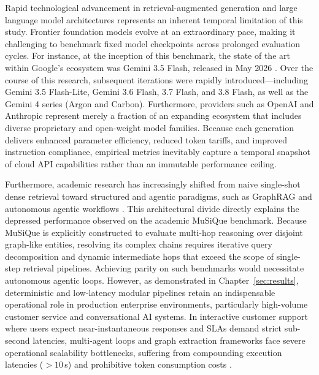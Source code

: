 Rapid technological advancement in retrieval-augmented generation and large language model architectures represents an inherent temporal limitation of this study. Frontier foundation models evolve at an extraordinary pace, making it challenging to benchmark fixed model checkpoints across prolonged evaluation cycles. For instance, at the inception of this benchmark, the state of the art within Google's ecosystem was Gemini 3.5 Flash, released in May 2026 \citep{GoogleCloudModelVersions}. Over the course of this research, subsequent iterations were rapidly introduced---including Gemini 3.5 Flash-Lite, Gemini 3.6 Flash, 3.7 Flash, and 3.8 Flash, as well as the Gemini 4 series (Argon and Carbon). Furthermore, providers such as OpenAI and Anthropic represent merely a fraction of an expanding ecosystem that includes diverse proprietary and open-weight model families. Because each generation delivers enhanced parameter efficiency, reduced token tariffs, and improved instruction compliance, empirical metrics inevitably capture a temporal snapshot of cloud API capabilities rather than an immutable performance ceiling.

Furthermore, academic research has increasingly shifted from naive single-shot dense retrieval toward structured and agentic paradigms, such as GraphRAG \citep{edge2024localglobalgraphrag, procko2024graphrag} and autonomous agentic workflows \citep{lumer2025rethinking, singh2025agentic}. This architectural divide directly explains the depressed performance observed on the academic MuSiQue benchmark. Because MuSiQue is explicitly constructed to evaluate multi-hop reasoning over disjoint graph-like entities, resolving its complex chains requires iterative query decomposition and dynamic intermediate hops that exceed the scope of single-step retrieval pipelines. Achieving parity on such benchmarks would necessitate autonomous agentic loops. However, as demonstrated in Chapter~\ref{sec:results}, deterministic and low-latency modular pipelines retain an indispensable operational role in production enterprise environments, particularly high-volume customer service and conversational AI systems. In interactive customer support where users expect near-instantaneous responses and SLAs demand strict sub-second latencies, multi-agent loops and graph extraction frameworks face severe operational scalability bottlenecks, suffering from compounding execution latencies ($>10$\,s) and prohibitive token consumption costs \citep{chen2026logicrag, lumer2025rethinking}.

